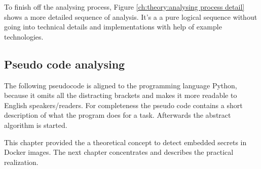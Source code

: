 To finish off the analysing process, Figure \ref{ch:theory:analysing process detail} shows a more detailed sequence of analysis.
It's a a pure logical sequence without going into technical details and implementations with help of example technologies. 

\subsection{Pseudo code analysing}
\label{ch:theory:analysing_pseudocode}
The following pseudocode is aligned to the programming language Python, because it omits all the distracting brackets and makes it more readable to English speakers/readers.
For completeness the pseudo code contains a short description of what the program does for a task. Afterwards the abstract algorithm is started.


This chapter provided the a theoretical concept to detect embedded secrets in Docker images. The next chapter concentrates and describes the practical realization.
